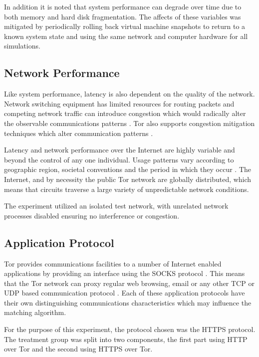 \documentclass{ecuthesis}
\begin{document}
In addition it is noted that system performance can degrade over time due to
both memory and hard disk fragmentation. The affects of these variables was
mitigated by periodically rolling back virtual machine snapshots to return to a
known system state and using the same network and computer hardware for all
simulations.

\subsection{Network Performance}

Like system performance, latency is also dependent on the quality of the
network. Network switching equipment has limited resources for routing packets
and competing network traffic can introduce congestion which would radically
alter the observable communications patterns \parencite{Jacobson:1995p6768}.
Tor also supports congestion mitigation techniques which alter communication
patterns \parencite[8]{Dingledine:2004p314}.

Latency and network performance over the Internet are highly variable and
beyond the control of any one individual. Usage patterns vary according to
geographic region, societal conventions and the period in which they occur
\parencite{Thompson97wide-areainternet,Ken03longitudinalstudy}. The Internet,
and by necessity the public Tor network are globally distributed, which means
that circuits traverse a large variety of unpredictable network conditions.

The experiment utilized an isolated test network, with unrelated network
processes disabled ensuring no interference or congestion.

\subsection{Application Protocol}

Tor provides communications facilities to a number of Internet enabled
applications by providing an interface using the SOCKS protocol
\parencite[17]{Dingledine:2004p314}. This means that the Tor network can proxy
regular web browsing, email or any other TCP or UDP based communication protocol
\parencite{website:socks}. Each of these application protocols have their own
distinguishing communications characteristics which may influence the matching
algorithm.

For the purpose of this experiment, the protocol chosen was the HTTPS protocol.
The treatment group was split into two components, the first part using HTTP
over Tor and the second using HTTPS over Tor.
\end{document}

